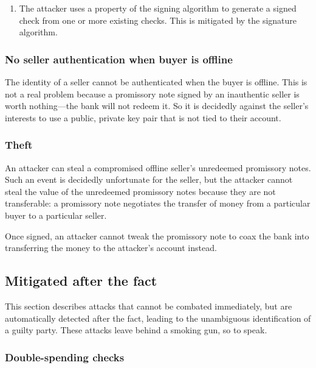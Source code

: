 \documentclass[12pt,a4paper]{article}
\begin{document}
\begin{multicols}{2}
\begin{enumerate}
		\item The attacker uses a property of the signing algorithm to generate a signed check from one or more existing checks. This is mitigated by the signature algorithm. 
	\end{enumerate}

	\subsubsection{No seller authentication when buyer is offline} \label{sec:lack-of-seller-authentication}

	The identity of a seller cannot be authenticated when the buyer is offline. This is not a real problem because a promissory note signed by an inauthentic seller is worth nothing---the bank will not redeem it. So it is decidedly against the seller's interests to use a public, private key pair that is not tied to their account.
	
	\subsubsection{Theft}

	An attacker can steal a compromised offline seller's unredeemed promissory notes. Such an event is decidedly unfortunate for the seller, but the attacker cannot steal the value of the unredeemed promissory notes because they are not transferable: a promissory note negotiates the transfer of money from a particular buyer to a particular seller. 

	Once signed, an attacker cannot tweak the promissory note to coax the bank into transferring the money to the attacker's account instead.

	\subsection{Mitigated after the fact}

	This section describes attacks that cannot be combated immediately, but are automatically detected after the fact, leading to the unambiguous identification of a guilty party. These attacks leave behind a smoking gun, so to speak.

	\subsubsection{Double-spending checks}
	\label{sec:double-spending-checks}


\end{multicols}
\end{document}
